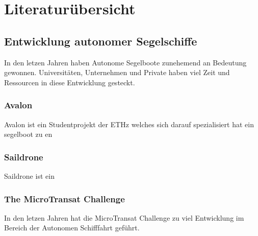 

\chapter{Literaturübersicht }
\label{chap:literaturübersicht}


\section{Entwicklung autonomer Segelschiffe}
In den letzen Jahren haben Autonome Segelboote zunehemend an Bedeutung gewonnen. Universitäten, Unternehmen und Private haben viel Zeit und Ressourcen in diese Entwicklung gesteckt.

\subsection{Avalon}
Avalon ist ein Studentprojekt der ETHz welches sich darauf spezialisiert hat ein segelboot zu en

\subsection{Saildrone}
Saildrone ist ein 

\subsection{The MicroTransat Challenge}
In den letzen Jahren hat die MicroTransat Challenge zu viel Entwicklung im Bereich der Autonomen Schifffahrt geführt.  




